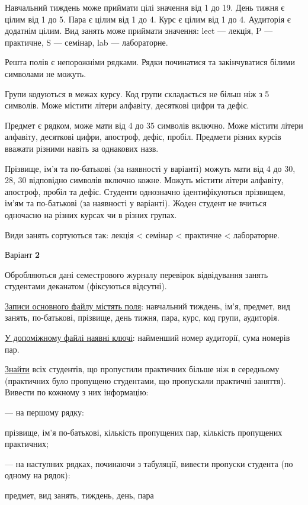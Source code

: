 \documentclass[11pt, ukrainian]{article}
\begin{document}
Навчальний тиждень може приймати цілі значення від 1 до 19.
День тижня є цілим від 1 до 5. Пара є цілим від 1 до 4.
Курс є цілим від 1 до 4. Аудиторія є додатнім цілим.
Вид занять може приймати значення:
lect --- лекція, P --- практичне, S --- семінар, lab --- лабораторне.

Решта полів є непорожніми рядками.
Рядки починатися та закінчуватися білими символами не можуть.

Групи кодуються в межах курсу.
Код групи складається не більш ніж з 5 символів.
Може містити літери алфавіту, десяткові цифри та дефіс.

Предмет є рядком, може мати від 4 до 35 символів включно.
Може містити літери алфавіту, десяткові цифри, апостроф, дефіс, пробіл.
Предмети різних курсів вважати різними навіть за однакових назв.

Прізвище, ім’я та по-батькові (за наявності у варіанті)
можуть мати від 4 до 30, 28, 30 відповідно символів включно кожне.
Можуть містити літери алфавіту, апостроф, пробіл та дефіс.
Студенти однозначно ідентифікуються прізвищем, ім’ям та по-батькові (за наявності у варіанті).
Жоден студент не вчиться одночасно на різних курсах чи в різних групах.

Види занять сортуються так: лекція < семінар < практичне < лабораторне.



\par
\newpage
{\center Варіант  \No \textbf { 2 }\par}
\bigskip
Обробляються дані семестрового журналу перевірок відвідування занять студентами деканатом (фіксуються відсутні). 

\underline{Записи основного файлу містять поля}: навчальний тиждень, ім’я, предмет, вид занять, по-батькові, прізвище, день тижня, пара, курс, код групи, аудиторія.

\underline{У допоміжному файлі наявні ключі}: найменший номер аудиторії, сума номерів пар.

\underline{Знайти} всіх студентів, що пропустили практичних більше ніж в середньому (практичних було пропущено студентами, що пропускали практичні заняття). Вивести по кожному з них інформацію:\par
{\noindent}--- на першому рядку:\par
прізвище, ім’я по-батькові, кількість пропущених пар, кількість пропущених практичних;

{\noindent}--- на наступних рядках, починаючи з табуляції, вивести пропуски студента (по одному на рядок):\par
предмет, вид занять, тиждень, день, пара
\end{document}
